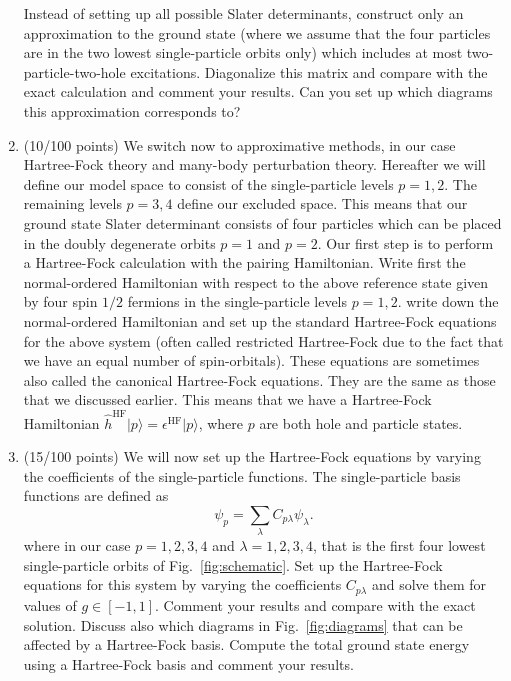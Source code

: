 \documentclass[prc]{revtex4} \usepackage[dvips]{graphicx}
\begin{document}
\begin{enumerate}
Instead of setting up all possible Slater determinants, construct only
an approximation to the ground state (where we assume that the four
particles are in the two lowest single-particle orbits only) which
includes at most two-particle-two-hole excitations. Diagonalize this
matrix and compare with the exact calculation and comment your
results. Can you set up which diagrams this approximation corresponds
to?
\item  (10/100 points) We switch now to approximative methods, in our case Hartree-Fock
  theory and many-body perturbation theory. Hereafter we will define
  our model space to consist of the single-particle levels $p=1,2$.
  The remaining levels $p=3,4$ define our excluded space.  This means
  that our ground state Slater determinant consists of four particles
  which can be placed in the doubly degenerate orbits $p=1$ and $p=2$.
  Our first step is to perform a Hartree-Fock calculation with the
  pairing Hamiltonian.  Write first the normal-ordered Hamiltonian
  with respect to the above reference state given by four spin $1/2$
  fermions in the single-particle levels $p=1,2$. write down the normal-ordered
  Hamiltonian and set up the standard Hartree-Fock equations for the above system
  (often called restricted Hartree-Fock due to the fact that  we have an equal number of spin-orbitals).
  These equations are sometimes also called the canonical Hartree-Fock equations. They are the same as those that we discussed earlier. This means that we have
  a Hartree-Fock Hamiltonian $\hat{h}^{\mathrm{HF}}\vert p\rangle = \epsilon^{\mathrm{HF}}\vert p\rangle$, where $p$ are both hole and particle states.
  
\item  (15/100 points)
We will now set up the Hartree-Fock equations by varying the
coefficients of the single-particle functions. The single-particle
basis functions are defined as
\[
\psi_p = \sum_{\lambda} C_{p\lambda}\psi_{\lambda}.
\]
where in our case $p=1,2,3,4$ and $\lambda=1,2,3,4$, that is the first
four lowest single-particle orbits of Fig.~\ref{fig:schematic}.  Set
up the Hartree-Fock equations for this system by varying the
coefficients $C_{p\lambda}$ and solve them for values of $g\in
[-1,1]$.  Comment your results and compare with the exact
solution. Discuss also which diagrams in Fig.~\ref{fig:diagrams} that
can be affected by a Hartree-Fock basis. Compute the total ground state energy  using a Hartree-Fock basis and comment your results.


\end{enumerate}
\end{document}
